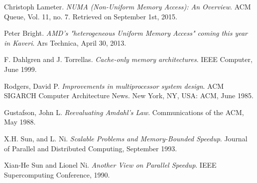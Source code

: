 \documentclass[12pt]{article}
\numberwithin{equation}{section}
\numberwithin{table}{section}
\numberwithin{figure}{section}
\begin{document}
\begin{thebibliography}{9}
	Christoph Lameter. 
	\textit{NUMA (Non-Uniform Memory Access): An Overview}. ACM Queue, Vol. 11, no. 7. Retrieved on September 1st, 2015.
	
	Peter Bright. 
	\textit{AMD's "heterogeneous Uniform Memory Access" coming this year in Kaveri}. Ars Technica, April 30, 2013.
	
	F. Dahlgren and J. Torrellas. 
	\textit{Cache-only memory architectures}. IEEE Computer, June 1999.
	
	Rodgers, David P. 
	\textit{Improvements in multiprocessor system design}. ACM SIGARCH Computer Architecture News. New York, NY, USA: ACM, June 1985.
	
	Gustafson, John L.  
	\textit{Reevaluating Amdahl's Law}. Communications of the ACM, May 1988.
	
	X.H. Sun, and L. Ni.	  
	\textit{Scalable Problems and Memory-Bounded Speedup}. Journal of Parallel and Distributed Computing, September 1993.
	
	Xian-He Sun and Lionel Ni.	  
	\textit{Another View on Parallel Speedup}. IEEE Supercomputing Conference, 1990.
	
\end{thebibliography}
\end{document}
